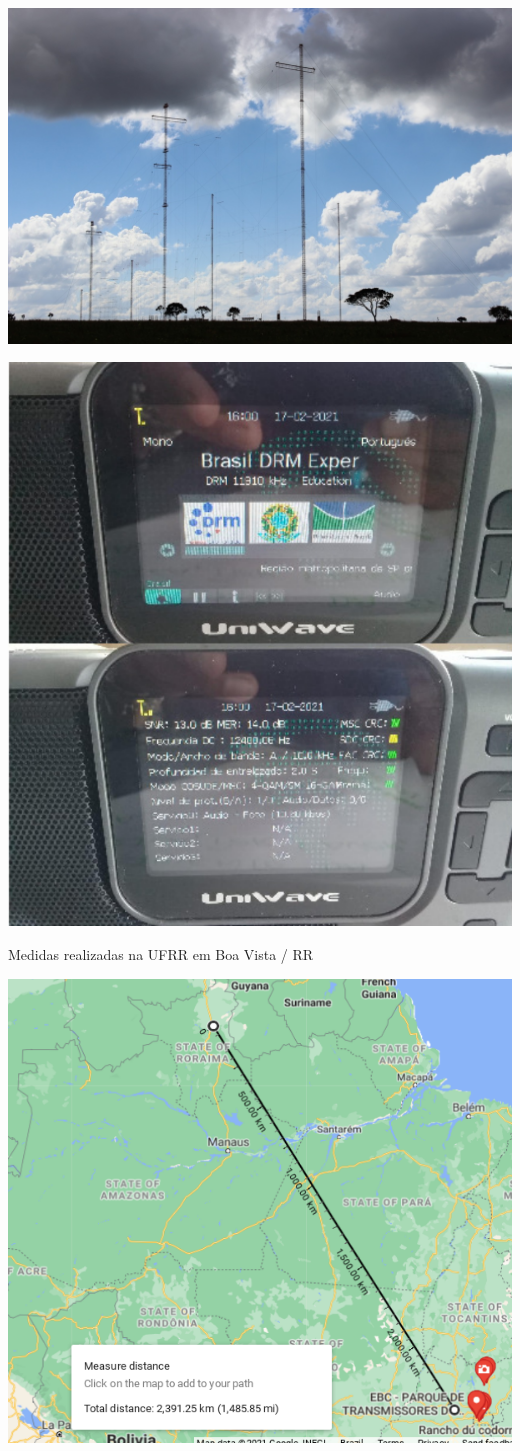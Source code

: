 \begin{frame}

  \begin{center}
    \includegraphics[width=.8\columnwidth]{rodeador.jpg}
  \end{center}

\end{frame}

\begin{frame}

    \begin{center}
      \includegraphics[width=.45\columnwidth]{radio.jpg}
    \end{center}

\end{frame}

\begin{frame}

  \begin{block}{Medidas realizadas na UFRR em Boa Vista / RR}
    \begin{center}
      \includegraphics[width=0.5\columnwidth]{map.png}
    \end{center}
  \end{block}

\end{frame}


